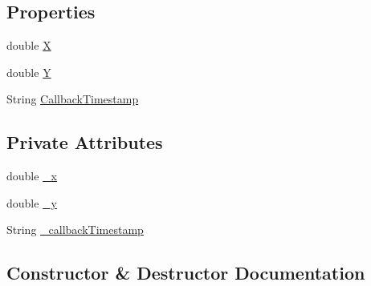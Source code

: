 \subsection*{Properties}
\begin{DoxyCompactItemize}
\item 
double \hyperlink{class_web_analyzer_1_1_models_1_1_data_model_1_1_eye_tracking_data_afc6ab652582e4aaccb30d64fb58a2a0c}{X}
\item 
double \hyperlink{class_web_analyzer_1_1_models_1_1_data_model_1_1_eye_tracking_data_a2b76ad3ab08710a4ef0ecf42c6b6a8f3}{Y}
\item 
String \hyperlink{class_web_analyzer_1_1_models_1_1_data_model_1_1_eye_tracking_data_a2e2cc407404ad7cd9fbd75be533d5967}{Callback\+Timestamp}
\end{DoxyCompactItemize}
\subsection*{Private Attributes}
\begin{DoxyCompactItemize}
\item 
double \hyperlink{class_web_analyzer_1_1_models_1_1_data_model_1_1_eye_tracking_data_a040ec17c93661667ae300903426d0636}{\+\_\+x}
\item 
double \hyperlink{class_web_analyzer_1_1_models_1_1_data_model_1_1_eye_tracking_data_ac7453e0f55dabb4dfbde53d05e62c3e2}{\+\_\+y}
\item 
String \hyperlink{class_web_analyzer_1_1_models_1_1_data_model_1_1_eye_tracking_data_a97d12e2f65f19ac9e0e216d03be819f2}{\+\_\+callback\+Timestamp}
\end{DoxyCompactItemize}


\subsection{Constructor \& Destructor Documentation}
\hypertarget{class_web_analyzer_1_1_models_1_1_data_model_1_1_eye_tracking_data_a019976267c787cca233fa585617604a9}{}
